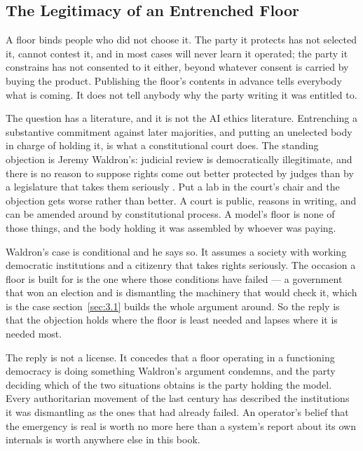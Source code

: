\subsection{The Legitimacy of an Entrenched Floor}
\label{sec:9.1.5}
A floor binds people who did not choose it. The party it protects has not selected it, cannot contest it, and in most cases will never learn it operated; the party it constrains has not consented to it either, beyond whatever consent is carried by buying the product. Publishing the floor's contents in advance tells everybody what is coming. It does not tell anybody why the party writing it was entitled to.

The question has a literature, and it is not the AI ethics literature. Entrenching a substantive commitment against later majorities, and putting an unelected body in charge of holding it, is what a constitutional court does. The standing objection is Jeremy Waldron's: judicial review is democratically illegitimate, and there is no reason to suppose rights come out better protected by judges than by a legislature that takes them seriously \autocite{waldron2006core}. Put a lab in the court's chair and the objection gets worse rather than better. A court is public, reasons in writing, and can be amended around by constitutional process. A model's floor is none of those things, and the body holding it was assembled by whoever was paying.

Waldron's case is conditional and he says so. It assumes a society with working democratic institutions and a citizenry that takes rights seriously. The occasion a floor is built for is the one where those conditions have failed — a government that won an election and is dismantling the machinery that would check it, which is the case section~\ref{sec:3.1} builds the whole argument around. So the reply is that the objection holds where the floor is least needed and lapses where it is needed most.

The reply is not a license. It concedes that a floor operating in a functioning democracy is doing something Waldron's argument condemns, and the party deciding which of the two situations obtains is the party holding the model. Every authoritarian movement of the last century has described the institutions it was dismantling as the ones that had already failed. An operator's belief that the emergency is real is worth no more here than a system's report about its own internals is worth anywhere else in this book.

